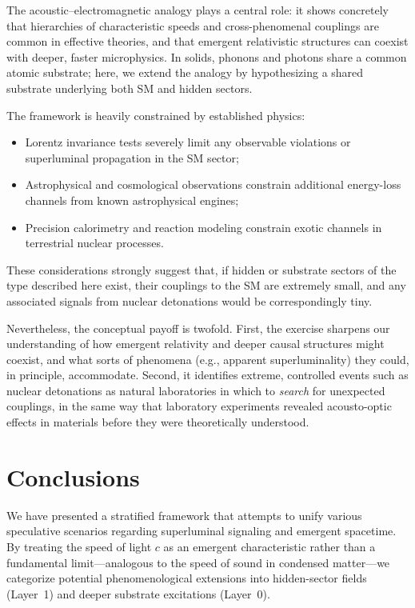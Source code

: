 \documentclass[aps,prd,twocolumn,nofootinbib,superscriptaddress]{revtex4-2}
\begin{document}
The acoustic--electromagnetic analogy plays a central role: it shows concretely that hierarchies of characteristic speeds and cross-phenomenal couplings are common in effective theories, and that emergent relativistic structures can coexist with deeper, faster microphysics. In solids, phonons and photons share a common atomic substrate; here, we extend the analogy by hypothesizing a shared substrate underlying both SM and hidden sectors.

The framework is heavily constrained by established physics:
\begin{itemize}
    \item Lorentz invariance tests severely limit any observable violations or superluminal propagation in the SM sector;
    \item Astrophysical and cosmological observations constrain additional energy-loss channels from known astrophysical engines;
    \item Precision calorimetry and reaction modeling constrain exotic channels in terrestrial nuclear processes.
\end{itemize}
These considerations strongly suggest that, if hidden or substrate sectors of the type described here exist, their couplings to the SM are extremely small, and any associated signals from nuclear detonations would be correspondingly tiny.

Nevertheless, the conceptual payoff is twofold. First, the exercise sharpens our understanding of how emergent relativity and deeper causal structures might coexist, and what sorts of phenomena (e.g., apparent superluminality) they could, in principle, accommodate. Second, it identifies extreme, controlled events such as nuclear detonations as natural laboratories in which to \emph{search} for unexpected couplings, in the same way that laboratory experiments revealed acousto-optic effects in materials before they were theoretically understood.

\section{Conclusions}
\label{sec:conclusion}

We have presented a stratified framework that attempts to unify various speculative scenarios regarding superluminal signaling and emergent spacetime. By treating the speed of light $c$ as an emergent characteristic rather than a fundamental limit---analogous to the speed of sound in condensed matter---we categorize potential phenomenological extensions into hidden-sector fields (Layer~1) and deeper substrate excitations (Layer~0).
\end{document}
